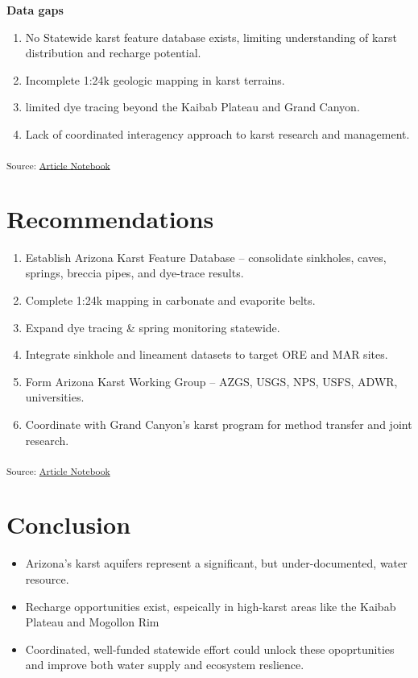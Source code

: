 \documentclass[
]{agujournal2019}
\providecommand{\tightlist}{%
  \setlength{\itemsep}{0pt}\setlength{\parskip}{0pt}}
\begin{document}
\textbf{Data gaps}

\begin{enumerate}
\def\labelenumi{\arabic{enumi}.}
\item
  No Statewide karst feature database exists, limiting understanding of
  karst distribution and recharge potential.
\item
  Incomplete 1:24k geologic mapping in karst terrains.
\item
  limited dye tracing beyond the Kaibab Plateau and Grand Canyon.
\item
  Lack of coordinated interagency approach to karst research and
  management.
\end{enumerate}

\textsubscript{Source:
\href{https://Ryan3Lima.github.io/ATUR-KARST/index.ipynb.html}{Article
Notebook}}

\section{Recommendations}\label{recommendations}

\begin{enumerate}
\def\labelenumi{\arabic{enumi}.}
\item
  Establish Arizona Karst Feature Database -- consolidate sinkholes,
  caves, springs, breccia pipes, and dye-trace results.
\item
  Complete 1:24k mapping in carbonate and evaporite belts.
\item
  Expand dye tracing \& spring monitoring statewide.
\item
  Integrate sinkhole and lineament datasets to target ORE and MAR sites.
\item
  Form Arizona Karst Working Group -- AZGS, USGS, NPS, USFS, ADWR,
  universities.
\item
  Coordinate with Grand Canyon's karst program for method transfer and
  joint research.
\end{enumerate}

\textsubscript{Source:
\href{https://Ryan3Lima.github.io/ATUR-KARST/index.ipynb.html}{Article
Notebook}}

\section{Conclusion}\label{conclusion}

\begin{itemize}
\tightlist
\item
  Arizona's karst aquifers represent a significant, but
  under-documented, water resource.
\item
  Recharge opportunities exist, espeically in high-karst areas like the
  Kaibab Plateau and Mogollon Rim
\item
  Coordinated, well-funded statewide effort could unlock these
  opoprtunities and improve both water supply and ecosystem reslience.
\end{itemize}
\end{document}
